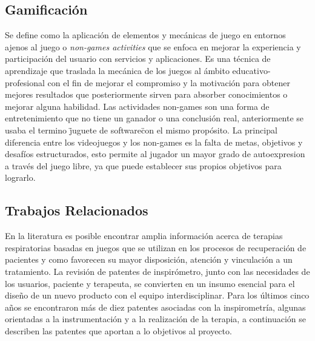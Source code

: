\subsection{Gamificaci\'on}

Se define como la aplicaci\'on de elementos y mec\'anicas de juego en entornos ajenos al juego o \textit{non-games activities} que se enfoca en mejorar la experiencia y participaci\'on del usuario con servicios y aplicaciones. Es una t\'ecnica de aprendizaje que traslada la mec\'anica de los juegos al \'ambito educativo-profesional con el fin de mejorar el compromiso y la motivaci\'on para obtener mejores resultados que posteriormente sirven para absorber conocimientos o mejorar alguna habilidad. Las actividades non-games son una forma de entretenimiento que no tiene un ganador o una conclusi\'on real, anteriormente se usaba el termino \"juguete de software\" con el mismo prop\'osito. La principal diferencia entre los videojuegos y los non-games es la falta de metas, objetivos y desaf\'ios estructurados, esto permite al jugador un mayor grado de autoexpresion a trav\'es del juego libre, ya que puede establecer sus propios objetivos para lograrlo.\cite{18}




\subsection{Trabajos Relacionados}

En la literatura es posible encontrar amplia informaci\'on acerca de terapias respiratorias basadas en juegos que se utilizan en los procesos de recuperaci\'on de pacientes y como favorecen su mayor disposici\'on, atenci\'on y vinculaci\'on a un tratamiento. La revisi\'on de patentes de inspir\'ometro, junto con las necesidades de los usuarios, paciente y terapeuta, se convierten en un insumo esencial para el dise\~{n}o de un nuevo producto con el equipo interdisciplinar. 
Para los \'ultimos cinco a\~{n}os se encontraron m\'as de diez patentes asociadas con la inspirometr\'ia, algunas orientadas a la instrumentaci\'on y a la realizaci\'on de la terapia, a continuaci\'on se describen las patentes que aportan a lo objetivos al proyecto. %


